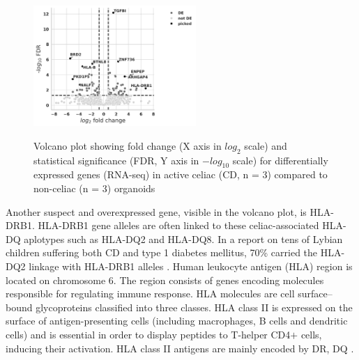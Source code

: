 \documentclass[12pt]{article}
\begin{document}
\begin{figure}[H]
    \centering
        \includegraphics[width=0.55\textwidth]{volcano_plot_quant_4.png}
        \label{fig:Volcano plot}
    
    \caption{Volcano
plot showing fold change (X axis in $log_{2}$ scale) and statistical significance (FDR, Y axis in $-log_{10}$ scale) for
differentially expressed genes (RNA-seq) in active celiac (CD, n = 3) compared to non-celiac (n = 3) organoids}
    \label{fig:Volvano plot}
\end{figure}
\noindent Another suspect and overexpressed gene, visible in the volcano plot, is HLA-DRB1. HLA-DRB1 gene alleles are often linked to these celiac-associated HLA-DQ aplotypes such as HLA-DQ2 and HLA-DQ8. In a report on tens of Lybian children suffering both CD and type 1 diabetes mellitus, 70\% carried the HLA-DQ2 linkage with
HLA-DRB1 alleles \supercite{ghawil2012hla}. Human leukocyte antigen (HLA) region is located on chromosome 6. The region
consists of genes encoding molecules responsible for regulating immune response. HLA molecules are cell surface–bound glycoproteins classified into three classes. HLA class II is expressed on the surface of antigen-presenting cells (including macrophages, B cells and dendritic cells)
and is essential in order to display peptides to T-helper CD4$+$ cells, inducing their activation. HLA class
II antigens are mainly encoded by DR, DQ \supercite{wysocki2020current}.
\end{document}
